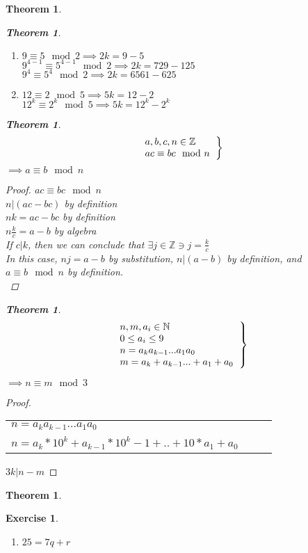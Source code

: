 \documentclass{article}
\newtheorem{theorem}[section]{Theorem}
\newtheorem{exercise}[section]{Exercise}
\begin{document}
\begin{theorem}
\begin{theorem}
\begin{enumerate}
			$1728 \equiv 8 \mod{5} \implies 5k = 1728-8$
		\item
			$9 \equiv 5 \mod{2} \implies 2k = 9-5$\\
			$9^{4-1} \equiv 5^{4-1} \mod{2} \implies 2k = 729-125$\\
			$9^4 \equiv 5^4 \mod{2} \implies 2k = 6561-625$
		\item
			$12 \equiv 2 \mod{5} \implies 5k = 12-2$\\
			$12^k \equiv 2^k \mod{5} \implies 5k = 12^k-2^k$
	\end{enumerate}
\end{theorem}\begin{theorem}%
		\[\left .
		\begin{tabular}{l}
			$a,b,c,n \in \mathbb{Z}$\\
			$ac \equiv bc \mod{n}$\\
		\end{tabular}
	\right \}\]
	$\implies a \equiv b \mod{n}$\\
	\end{theorem}\begin{proof} $ac \equiv bc \mod{n}$\\
	$n|(ac-bc)$ by definition\\
	$nk = ac - bc$ by definition\\
	$n \frac{k}{c} = a-b$ by algebra\\
	If $c|k$, then we can conclude that $\exists j \in \mathbb{Z} \ni j=\frac{k}{c}$\\
	In this case, $nj = a-b$ by substitution, $n|(a-b)$ by definition, and $a \equiv b \mod{n}$ by definition.\\
\end{proof}\begin{theorem}%
		\[\left .
		\begin{tabular}{l}
			$n,m,a_i \in \mathbb{N}$\\
			$0 \leq a_i \leq 9$\\
			$n = a_ka_{k-1}...a_1a_0$\\
			$m = a_k+a_{k-1}...+a_1+a_0$\\
		\end{tabular}
	\right \}\]
	\end{theorem}
	$\implies n \equiv m \mod{3}$\\
\end{theorem}\begin{proof}
    \begin{tabular}{l l l}
        $n = a_ka_{k-1}...a_1a_0$\\
        $n = a_k*10^k + a_{k-1}*10^k-1 + .. + 10*a_1 + a_0$\
        
    \end{tabular}
    $3k|n-m$
\end{proof}
\begin{theorem}%
    
\end{theorem}

	\begin{exercise}%
	    \begin{enumerate}
	    \item $25 = 7q + r$
	    \end{enumerate}
	\end{exercise}
	
\end{document}

